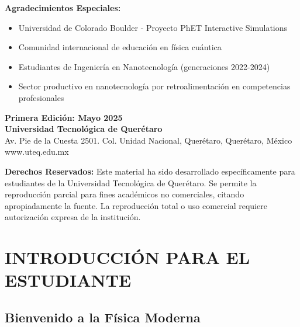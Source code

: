 \documentclass[12pt,a4paper]{book}
\begin{document}
	\vspace{1cm}
	
	\textbf{Agradecimientos Especiales:}
	\begin{itemize}[leftmargin=2cm]
		\item Universidad de Colorado Boulder - Proyecto PhET Interactive Simulations
		\item Comunidad internacional de educación en física cuántica
		\item Estudiantes de Ingeniería en Nanotecnología (generaciones 2022-2024)
		\item Sector productivo en nanotecnología por retroalimentación en competencias profesionales
	\end{itemize}
	
	\vspace{1cm}
	
	\begin{center}
		\textbf{Primera Edición: Mayo 2025}\\
		\textbf{Universidad Tecnológica de Querétaro}\\
		Av. Pie de la Cuesta 2501. Col. Unidad Nacional, Querétaro, Querétaro, México\\
		www.uteq.edu.mx
	\end{center}
	
	\vspace{1cm}
	
	\begin{tcolorbox}[colback=gray!10!white,colframe=gray]
		\textbf{Derechos Reservados:} Este material ha sido desarrollado específicamente para estudiantes de la Universidad Tecnológica de Querétaro. Se permite la reproducción parcial para fines académicos no comerciales, citando apropiadamente la fuente. La reproducción total o uso comercial requiere autorización expresa de la institución.
	\end{tcolorbox}
	
	\newpage
	
	\tableofcontents
	
	\listoftables
	
	\chapter{INTRODUCCIÓN PARA EL ESTUDIANTE}
	
	\section{Bienvenido a la Física Moderna}
	
\end{document}
